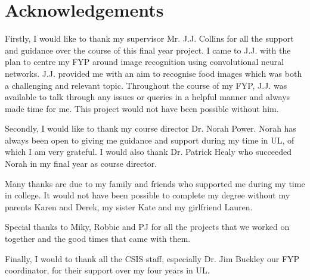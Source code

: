 \section*{Acknowledgements}
Firstly, I would like to thank my supervisor Mr. J.J. Collins for all the support and guidance over the course of this final year project.
I came to J.J. with the plan to centre my FYP around image recognition using convolutional neural networks.
J.J. provided me with an aim to recognise food images which was both a challenging and relevant topic.
Throughout the course of my FYP, J.J. was available to talk through any issues or queries in a helpful manner and always made time for me.
This project would not have been possible without him.

Secondly, I would like to thank my course director Dr. Norah Power.
Norah has always been open to giving me guidance and support during my time in UL, of which I am very grateful.
I would also thank Dr. Patrick Healy who succeeded Norah in my final year as course director.

Many thanks are due to my family and friends who supported me during my time in college.
It would not have been possible to complete my degree without my parents Karen and Derek, my sister Kate and my girlfriend Lauren.

Special thanks to Miky, Robbie and PJ for all the projects that we worked on together and the good times that came with them.

Finally, I would to thank all the CSIS staff, especially Dr. Jim Buckley our FYP coordinator, for their support over my four years in UL.